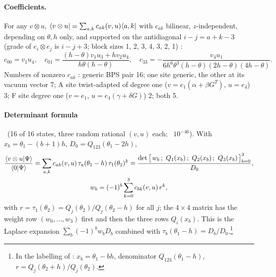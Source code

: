 \paragraph{Coefficients.} For any $v\otimes u$, $\langle v\otimes u|=\sum_{a,k}c_{ak}(v,u)\langle a,k|$ with $c_{ak}$ bilinear, $z$-independent, depending on $\theta,h$ only, and supported on the
antidiagonal $i-j=a+k-3$ (grade of $e_i\otimes e_j$ is $i-j+3$; block sizes 1, 2, 3, 4, 3, 2, 1) \ex:
\begin{equation}
 c_{00}=v_1u_4,\quad c_{01}=\frac{(h-\theta)v_1u_3+hv_2u_4}{h\theta(h-\theta)},\quad
 c_{33}=-\frac{v_4u_1}{6h^6\theta^3(h-\theta)(2h-\theta)(4h-\theta)}.
\end{equation}
Numbers of nonzero $c_{ak}$ \ex: generic BPS pair 16; one site generic, the other at its vacuum vector 7; A site twist-adapted of degree one
($v=e_1(\alpha+\beta G^T)$, $u=e_4$) 3; F site degree one ($v=e_1$, $u=e_4(\gamma+\delta G)$) 2; both 5.

\paragraph{Determinant formula} \ex\ (16 of 16 states, three random rational $(v,u)$ each; \hp\ $10^{-46}$). With $x_b=\theta_1-(b+1)h$, $D_0=Q_{123}(\theta_1-2h)$,
\begin{multline}\label{eq:sov-det}
 \frac{\braket{v\otimes u}{\Psi}}{\braket0\Psi}=\sum_{a,k}c_{ak}(v,u)\,\tau_a(\theta_1-h)\,\tau_1(\theta_2)^k=
 \frac{\det\big[\,w_b\,;\ Q_1(x_b)\,;\ Q_2(x_b)\,;\ Q_3(x_b)\,\big]_{b=0}^{3}}{D_0},\\
 w_b=(-1)^b\sum_{k=0}^3c_{bk}(v,u)\,r^k,
\end{multline}
with $r=\tau_1(\theta_2)=Q_j(\theta_2)/Q_j(\theta_2-h)$ for all $j$; the $4\times4$ matrix has the weight row $(w_0,\dots,w_3)$ first and then the three rows $Q_i(x_b)$. This is the Laplace
expansion $\sum_b(-1)^bw_bD_b$ combined with $\tau_b(\theta_1-h)=D_b/D_0$.\footnote{In the labelling of : $x_b=\theta_1-bh$, denominator $Q_{123}(\theta_1-h)$, $r=Q_j(\theta_2+h)/Q_j(\theta_2)$.}

